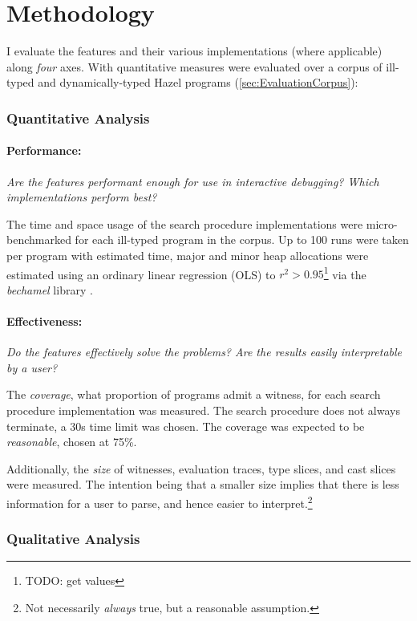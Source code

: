 \section{Methodology}\label{sec:EvaluationMethodology}
I evaluate the features and their various implementations (where applicable) along \textit{four} axes. With quantitative measures were evaluated over a corpus of ill-typed and dynamically-typed Hazel programs (\cref{sec:EvaluationCorpus}):

\subsubsection{Quantitative Analysis}
\paragraph{Performance: } \textit{Are the features performant enough for use in interactive debugging? Which implementations perform best?}

The time and space usage of the search procedure implementations were micro-benchmarked for each ill-typed program in the corpus. Up to 100 runs were taken per program with estimated time, major and minor heap allocations were estimated using an ordinary linear regression (OLS) to $r^2 > 0.95$\footnote{TODO: get values} via the \textit{bechamel} library \cite{Bechamel}.

\paragraph{Effectiveness: } \textit{Do the features effectively solve the problems? Are the results easily interpretable by a user?}

The \textit{coverage},  what proportion of programs admit a witness, for each search procedure implementation was measured. The search procedure does not always terminate, a 30s time limit was chosen. The coverage was expected to be \textit{reasonable}, chosen at 75\%.

Additionally, the \textit{size} of witnesses, evaluation traces, type slices, and cast slices were measured. The intention being that a smaller size implies that there is less information for a user to parse, and hence easier to interpret.\footnote{Not necessarily \textit{always} true, but a reasonable assumption.}

\subsubsection{Qualitative Analysis}
